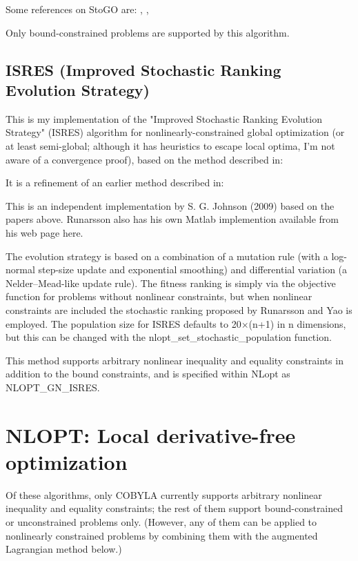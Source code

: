 Some references on StoGO are: \cite{Gudmundsson1998}, \cite{Madsen_1998}, \cite{Zertchaninov1998}


Only bound-constrained problems are supported by this algorithm. 





\subsection{ISRES (Improved Stochastic Ranking Evolution Strategy)}
This is my implementation of the "Improved Stochastic Ranking Evolution Strategy" (ISRES) algorithm for nonlinearly-constrained global optimization (or at least semi-global; although it has heuristics to escape local optima, I'm not aware of a convergence proof), based on the method described in: \cite{Runarsson_2005}


It is a refinement of an earlier method described in: \cite{Runarsson_2000}



This is an independent implementation by S. G. Johnson (2009) based on the papers above. Runarsson also has his own Matlab implemention available from his web page here. 

The evolution strategy is based on a combination of a mutation rule (with a log-normal step-size update and exponential smoothing) and differential variation (a Nelder–Mead-like update rule). The fitness ranking is simply via the objective function for problems without nonlinear constraints, but when nonlinear constraints are included the stochastic ranking proposed by Runarsson and Yao is employed. The population size for ISRES defaults to 20×(n+1) in n dimensions, but this can be changed with the nlopt\_set\_stochastic\_population function. 

This method supports arbitrary nonlinear inequality and equality constraints in addition to the bound constraints, and is specified within NLopt as NLOPT\_GN\_ISRES. 





\section{NLOPT: Local derivative-free optimization}
\label{LocalDerivativeFreeOptimization}

Of these algorithms, only COBYLA currently supports arbitrary nonlinear inequality and equality constraints; the rest of them support bound-constrained or unconstrained problems only. (However, any of them can be applied to nonlinearly constrained problems by combining them with the augmented Lagrangian method below.) 


